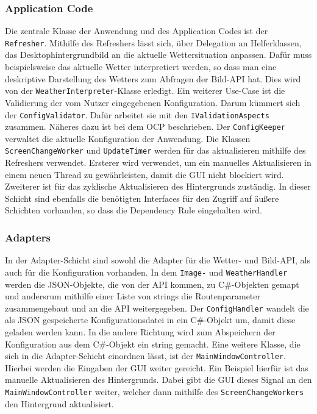 \subsubsection{Application Code}
Die zentrale Klasse der Anwendung und des Application Codes ist der \texttt{Refresher}. Mithilfe des Refreshers lässt sich, über Delegation an Helferklassen, das Desktophintergrundbild an die aktuelle Wettersituation anpassen. Dafür muss beispielsweise das aktuelle Wetter interpretiert werden, so dass man eine deskriptive Darstellung des Wetters zum Abfragen der Bild-API hat. Dies wird von der \texttt{WeatherInterpreter}-Klasse erledigt. Ein weiterer Use-Case ist die Validierung der vom Nutzer eingegebenen Konfiguration. Darum kümmert sich der \texttt{ConfigValidator}. Dafür arbeitet sie mit den \texttt{IValidationAspects} zusammen. Näheres dazu ist bei dem OCP beschrieben. Der \texttt{ConfigKeeper} verwaltet die aktuelle Konfiguration der Anwendung. Die Klassen \texttt{ScreenChangeWorker} und \texttt{UpdateTimer} werden für das aktualisieren mithilfe des Refreshers verwendet. Ersterer wird verwendet, um ein manuelles Aktualisieren in einem neuen Thread zu gewährleisten, damit die GUI nicht blockiert wird. Zweiterer ist für das zyklische Aktualisieren des Hintergrunds zuständig. In dieser Schicht sind ebenfalls die benötigten Interfaces für den Zugriff auf äußere Schichten vorhanden, so dass die Dependency Rule eingehalten wird.
\subsubsection{Adapters}
In der Adapter-Schicht sind sowohl die Adapter für die Wetter- und Bild-API, als auch für die Konfiguration vorhanden. In dem \texttt{Image-} und \texttt{WeatherHandler} werden die JSON-Objekte, die von der API kommen, zu C\#-Objekten gemapt und andersrum mithilfe einer Liste von strings die Routenparameter zusammengebaut und an die API weitergegeben. Der \texttt{ConfigHandler} wandelt die als JSON gespeicherte Konfigurationsdatei in ein C\#-Objekt um, damit diese geladen werden kann. In die andere Richtung wird zum Abspeichern der Konfiguration aus dem C\#-Objekt ein string gemacht. Eine weitere Klasse, die sich in die Adapter-Schicht einordnen lässt, ist der \texttt{MainWindowController}. Hierbei werden die Eingaben der GUI weiter gereicht. Ein Beispiel hierfür ist das manuelle Aktualisieren des Hintergrunds. Dabei gibt die GUI dieses Signal an den \texttt{MainWindowController} weiter, welcher dann mithilfe des \texttt{ScreenChangeWorkers} den Hintergrund aktualisiert.

